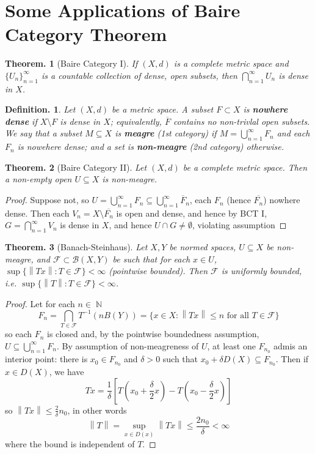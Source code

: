 \documentclass[11pt, a4paper]{memoir}
\DeclareMathOperator{\N}{{\mathbb{N}}}
\newcommand{\norm}[1]{\ensuremath{\left\lVert#1\right\rVert}}
\theoremstyle{change}
\newtheorem{theorem}{Theorem.}[section]
\theoremstyle{plain}
\theoremstyle{nonumberplain}
\newtheorem{definition}{Definition.}
\newtheorem{proof}{Proof}
\numberwithin{equation}{section}
\begin{document}
\section{Some Applications of Baire Category Theorem}
\begin{theorem}[Baire Category I]
    If $(X,d)$ is a complete metric space and $\{U_n\}_{n=1}^\infty$ is a countable collection of dense, open subsets, then $\bigcap_{n=1}^\infty U_n$ is dense in $X$.
\end{theorem}
\begin{definition}
    Let $(X,d)$ be a metric space.
    A subset $F\subset X$ is \textbf{nowhere dense} if $X\setminus F$ is dense in $X$; equivalently, $\overline{F}$ contains no non-trivlal open subsets.
    We say that a subset $M\subseteq X$ is \textbf{meagre} (1st category) if $M=\bigcup_{n=1}^\infty F_n$ and each $F_n$ is nowehere dense; and a set is \textbf{non-meagre} (2nd category) otherwise.
\end{definition}
\begin{theorem}[Baire Category II]
    Let $(X,d)$ be a complete metric space.
    Then a non-empty open $U\subseteq X$ is non-meagre.
\end{theorem}
\begin{proof}
    Suppose not, so $U=\bigcup_{n=1}^\infty F_n\subseteq\bigcup_{n=1}^\infty\overline{F}_n$, each $F_n$ (hence $\overline{F_n}$) nowhere dense.
    Then each $V_n=X\setminus\overline{F_n}$ is open and dense, and hence by BCT I, $G=\bigcap_{n=1}^\infty V_n$ is dense in $X$, and hence $U\cap G\neq\emptyset$, violating assumption
\end{proof}
\begin{theorem}[Banach-Steinhaus]
    Let $X,Y$ be normed spaces, $U\subseteq X$ be non-meagre, and $\mathcal{F}\subset\mathcal{B}(X,Y)$ be such that for each $x\in U$, $\sup\{\norm{Tx}:T\in\mathcal{F}\}<\infty$ (pointwise bounded).
    Then $\mathcal{F}$ is uniformly bounded, i.e. $\sup\{\norm{T}:T\in\mathcal{F}\}<\infty$.
\end{theorem}
\begin{proof}
    Let for each $n\in\N$
    \begin{equation*}
        F_n=\bigcap_{T\in\mathcal{F}} T^{-1}(nB(Y))=\{x\in X:\norm{Tx}\leq n\text{ for all }T\in\mathcal{F}\}
    \end{equation*}
    so each $F_n$ is closed and, by the pointwise boundedness assumption, $U\subseteq\bigcup_{n=1}^\infty F_n$.
    By assumption of non-meagreness of $U$, at least one $F_{n_0}$ admis an interior point: there is $x_0\in F_{n_0}$ and $\delta>0$ such that $x_0+\delta D(X)\subseteq F_{n_0}$.
    Then if $x\in D(X)$, we have
    \begin{equation*}
        Tx=\frac{1}{\delta}\left[T\left(x_0+\frac{\delta}{2}x\right)-T\left(x_0-\frac{\delta}{2}x\right)\right]
    \end{equation*}
    so $\norm{Tx}\leq\frac{2}{\delta}n_0$, in other words
    \begin{equation*}
        \norm{T}=\sup_{x\in D(x)}\norm{Tx}\leq\frac{2n_0}{\delta}<\infty
    \end{equation*}
    where the bound is independent of $T$.
\end{proof}
\end{document}
